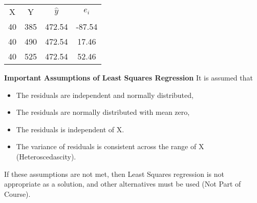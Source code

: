 \documentclass[]{report}
\begin{document}
	
%	
%	
	
	

	
	\begin{center}
		\begin{tabular}{|c|c|c|c|}
			\hline
			X & Y& $\hat{y}$ & $e_i$ \\
			40 &385 &472.54 &-87.54\\
			40 &490 &472.54 & 17.46\\
			40 &525 &472.54 & 52.46\\
			\hline
		\end{tabular}
	\end{center}
	
	
	
	\textbf{Important Assumptions of Least Squares Regression}
	It is assumed that
	\begin{itemize}
		\item The residuals are independent and normally distributed,
		\item The residuals are normally distributed with mean zero,
		\item The residuals is independent of X.
		\item The variance of residuals is consistent across the range of X (Heteroscedascity).
	\end{itemize}
	If these assumptions are not met, then Least Squares regression is not appropriate as a solution, and other alternatives must be used (Not Part of Course).
	
	





%
\end{document}
